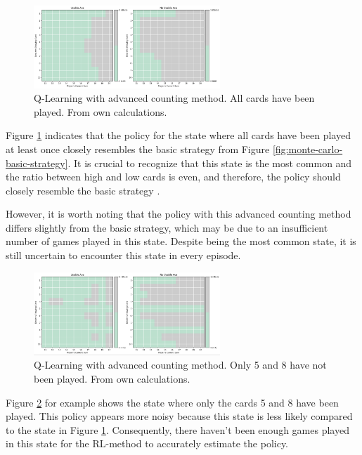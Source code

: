 \documentclass[conference]{IEEEtran}
\begin{document}
\begin{figure}
	\centering
	\includegraphics[width=70mm]{figures/Q-Learning/advanced-counting-10-million/policy-all-cards-played-1111111111.png}
	\caption{Q-Learning with advanced counting method. All cards have been played. From own calculations.}
	\label{fig:q-learning-advanced-all-cards-played}
\end{figure}

Figure \ref{fig:q-learning-advanced-all-cards-played} indicates that the policy for the state where all cards have been played at least once closely resembles the basic strategy from Figure \ref{fig:monte-carlo-basic-strategy}. It is crucial to recognize that this state is the most common and the ratio between high and low cards is even, and therefore, the policy should closely resemble the basic strategy \cite{b1}.

However, it is worth noting that the policy with this advanced counting method differs slightly from the basic strategy, which may be due to an insufficient number of games played in this state. Despite being the most common state, it is still uncertain to encounter this state in every episode.


\begin{figure}
	\centering
	\includegraphics[width=70mm]{figures/Q-Learning/advanced-counting-10-million/policy-5-8-not-played.png}
	\caption{Q-Learning with advanced counting method. Only 5 and 8 have not been played. From own calculations.}
	\label{fig:q-learning-advanced-5-8-not-played}
\end{figure}

Figure \ref{fig:q-learning-advanced-5-8-not-played} for example shows the state where only the cards 5 and 8 have been played. This policy appears more noisy because this state is less likely compared to the state in Figure \ref{fig:q-learning-advanced-all-cards-played}. Consequently, there haven't been enough games played in this state for the RL-method to accurately estimate the policy.
\end{document}
